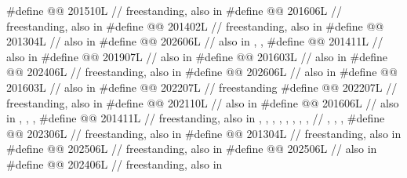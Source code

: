 \begin{codeblock}
#define @@                    201510L // freestanding, also in 
#define @@                   201606L // freestanding, also in 
#define @@             201402L // freestanding, also in 
#define @@                       201304L // also in 
#define @@                        202606L
  // also in , , 
#define @@                   201411L // also in 
#define @@                    201907L // also in 
#define @@            201603L // also in 
#define @@                            202406L // freestanding, also in 
#define @@                       202606L // also in 
#define @@                   201603L // also in 
#define @@                           202207L // freestanding
#define @@             202207L // freestanding, also in 
#define @@                202110L // also in 
#define @@                      201606L
  // also in , , , 
#define @@        201411L
  // freestanding, also in , , , , , , , ,
  // , , , 
#define @@                            202306L // freestanding, also in 
#define @@                    201304L // freestanding, also in 
#define @@             202506L // freestanding, also in 
#define @@                          202506L // also in 
#define @@            202406L // freestanding, also in 

\end{codeblock}
